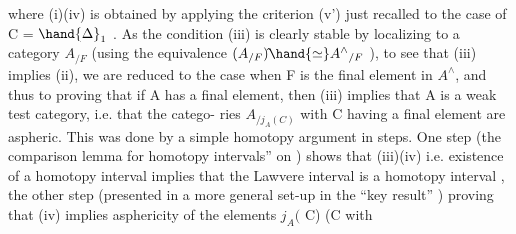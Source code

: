 where (i)\hand{$\Rightarrow$}(iv) is obtained by applying the criterion (v') just recalled
to the case of  C = $\hand{\Delta}_1$ .  As the condition (iii) is clearly stable by
localizing to a category $A_{/F}$  (using  the equivalence  $(A_{/F})\hat{} \hand{\simeq} A^\wedge{}_{/F}$ ), to
see that (iii) implies (ii),  we are reduced  to the case when F is the
final element in $A^\wedge$,  and thus to proving that if A  has a final element,
then (iii) implies that A is a weak test category,  i.e. that the catego-%
ries  $A_{/j_A(C)}$ \hand{,}with C  having a final element\hand{,}  are aspheric.
This was done by a simple  homotopy argument  in 
 steps.  One step  (the comparison lemma for homotopy intervals''
on )  shows that (iii)\hand{$\Rightarrow$}(iv)  i.e. existence of a homotopy interval
implies that the Lawvere interval is a homotopy interval ,  the other
step  (presented in a more general set-up in the ``key result''  )
proving that (iv)  implies asphericity of the elements $j_A($ C)  (C with
